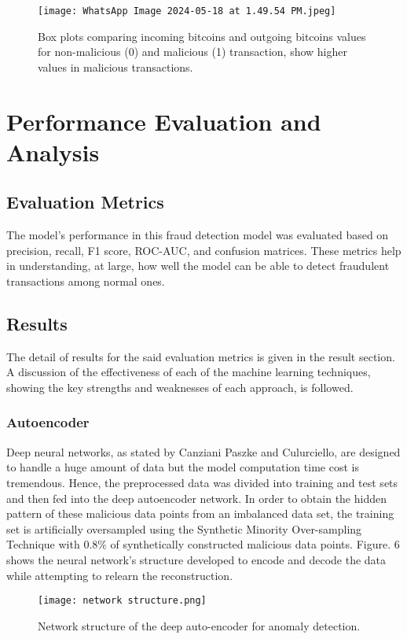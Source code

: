 \documentclass[journal]{IEEEtran}
\begin{document}
\begin{figure}[h!]
    \centering
    \texttt{[image: WhatsApp Image 2024-05-18 at 1.49.54 PM.jpeg]}
    \caption{Box plots comparing incoming bitcoins and outgoing bitcoins values for non-malicious (0) and malicious (1) transaction, show higher values in malicious transactions.}
    \label{fig:enter-label}
\end{figure}

\section{Performance Evaluation and Analysis}

\subsection{Evaluation Metrics}
The model's performance in this fraud detection model was evaluated based on precision, recall, F1 score, ROC-AUC, and confusion matrices. These metrics help in understanding, at large, how well the model can be able to detect fraudulent transactions among normal ones.

\subsection{Results}
The detail of results for the said evaluation metrics is given in the result section. A discussion of the effectiveness of each of the machine learning techniques, showing the key strengths and weaknesses of each approach, is followed.

\subsubsection{Autoencoder}
Deep neural networks, as stated by Canziani Paszke and Culurciello, are designed to handle a huge amount of data but the model computation time cost is tremendous. Hence, the preprocessed data was divided into training and test sets and then fed into the deep autoencoder network. In order to obtain the hidden pattern of these malicious data points from an imbalanced data set, the training set is artificially oversampled using the Synthetic Minority Over-sampling Technique with 0.8\% of synthetically constructed malicious data points. Figure. 6 shows the neural network’s structure developed to encode and decode the data while attempting to relearn the reconstruction.

\begin{figure}[h!] %
    \centering
    \texttt{[image: network structure.png]}  %
    \caption{Network structure of the deep auto-encoder for anomaly detection.}
    \label{fig:autoencoder-structure}
\end{figure}
\end{document}
